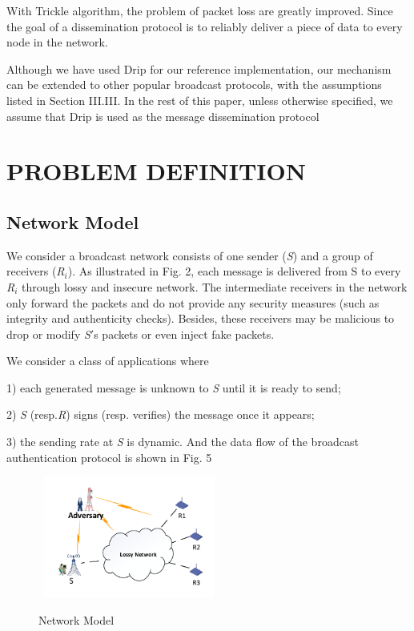 \documentclass{sig-alternate-05-2015}
\begin{document}
With Trickle algorithm, the problem of packet loss are greatly improved. Since the goal of a dissemination protocol is to reliably deliver a piece of data to every node in the network.
	
	Although we have used Drip for our reference implementation, our mechanism can be extended to other popular broadcast protocols, with the assumptions listed in Section III.III. In the rest of this paper, unless otherwise specified, we assume that Drip is used as the message dissemination protocol

\section{ PROBLEM DEFINITION}
\subsection{Network Model}
	We consider a broadcast network consists of one sender (\emph{S}) and a group of receivers (\emph{R$_i$}). As illustrated in Fig. 2, each message is delivered from S to every \emph{R$_i$} through lossy and insecure network. The intermediate receivers in the network only forward the packets and do not provide any security measures (such as integrity and authenticity checks). Besides, these receivers may be malicious to drop or modify \emph{S}$'$s packets or even inject fake packets.
	
	We consider a class of applications where
	
	1) each generated message is unknown to \emph{S} until it is ready to send; 
	
	2) \emph{S} (resp.\emph{R}) signs (resp. verifies) the message once it appears; 
	
	3) the sending rate at \emph{S} is dynamic. And the data flow of the broadcast authentication protocol is shown in Fig. 5
	
	
\begin{figure}
\centering
\includegraphics[width=6cm,height=4cm]{antenna.pdf}\\
\caption{Network Model}\label{} 
\end{figure}
\end{document}

